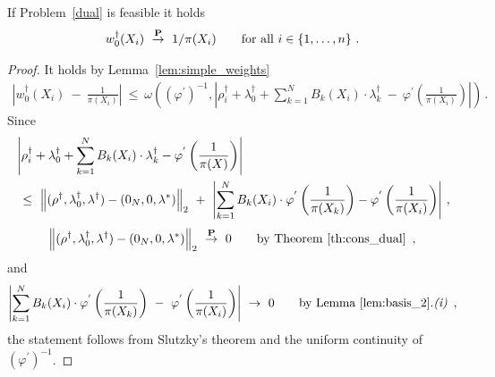 \begin{theorem}
  If Problem~\ref{dual} is feasible it holds
  \begin{align*}
  w_0^\dagger(X_i)
  \ 
  \overset{\P}{\to}
  \ 
  1/\pi(X_i)
  \qquad
  \text{for all}\ 
  i\in \left\{ 1,\ldots,n \right\}
  \,.
  \end{align*}
\end{theorem}
\begin{proof}
  It holds
  by Lemma~\ref{lem:simple_weights}
  \begin{align*}
    \left| 
    w_0^\dagger(X_i)
    \ 
    -
    \ 
    \frac{1}{\pi(X_i)}
    \right|
    \
    \le
    \
    \omega
    \left( 
      (\varphi^{'})^{-1}
      ,
      \left| 
      \rho_i^\dagger
      +
      \lambda_0^\dagger
      +
      \sum_{k=1}^{N} 
      B_k(X_i)\cdot\lambda_k^\dagger
      \ 
      -
      \ 
      \varphi^{'}
      \left( \frac{1}{\pi(X_i)} \right)
      \right|
    \right)
    \,.
  \end{align*}
  Since
  \begin{align*}
      &
      \left| 
      \rho_i^\dagger
      +
      \lambda_0^\dagger
      +
      \sum_{k=1}^{N} 
      B_k(X_i)\cdot\lambda_k^\dagger-
      \varphi^{'}
      \left( \frac{1}{\pi(X)} \right)
      \right|
      \\
      &
      \ 
      \le
      \ 
      \norm{
        (\rho^\dagger,\lambda_0^\dagger,\lambda^\dagger)
        -
        (0_N,0,\lambda^*)
      }_2
      \ 
      +
      \ 
      \left| 
      \sum_{k=1}^{N} 
      B_k(X_i)\cdot
      \varphi^{'}
      \left( \frac{1}{\pi(X_k)} \right)
      -
      \varphi^{'}
      \left( \frac{1}{\pi(X_i)} \right)
      \right|
      \,,
  \end{align*}
  \begin{align*}
      \norm{
        (\rho^\dagger,\lambda_0^\dagger,\lambda^\dagger)
        -
        (0_N,0,\lambda^*)
      }_2
      \ 
      \overset{\P}{\to}
      \ 
      0
      \qquad
      \text{by Theorem~\ref{th:cons_dual}
      }
      \,,
  \end{align*}
  and
  \begin{align*}
      \left| 
      \sum_{k=1}^{N} 
      B_k(X_i)\cdot
      \varphi^{'}
      \left( \frac{1}{\pi(X_k)} \right)
      \ 
      -
      \ 
      \varphi^{'}
      \left( \frac{1}{\pi(X_i)} \right)
      \right|
      \ 
      \to
      \ 
      0
      \qquad
      \text{by Lemma~\ref{lem:basis_2}.\textit{(i)}
      }
      \,,
  \end{align*}
  the statement follows from Slutzky's theorem
  and the uniform continuity of 
  $
  \left( 
      \varphi^{'}
    \right)^{-1}
  $.
\end{proof}
